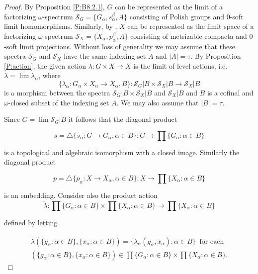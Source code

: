 \documentclass[12pt,draft]{amsart}
\theoremstyle{plain}
\theoremstyle{definition}
\numberwithin{equation}{section}
\begin{document}
\begin{proof}
By Proposition \ref{P:B8.2.1},  $G$ can be represented as
the limit of a factorizing $\omega$-spectrum
${\mathcal S}_{G} = \{ G_{\alpha}, s_{\alpha}^{\beta}, A\}$
consisting of Polish groups and $0$-soft limit homomorphisms.
Similarly, by \cite[Proposition 6.3.5]{chibook96}, $X$ can be
represented as the limit space of a factorizing $\omega$-spectrum
${\mathcal S}_{X} = \{ X_{\alpha}, p_{\alpha}^{\beta}, A\}$
consisting of metrizable compacta and $0$-soft limit projections.
Without loss of generality we may assume that these spectra
${\mathcal S}_{G}$ and ${\mathcal S}_{X}$ have the same indexing
set $A$ and $|A| = \tau$. By Proposition \ref{P:action}, the given
action $\lambda \colon G \times X \to X$ is the limit of level
actions, i.e.
$\lambda = \lim \lambda_{\alpha}$, where 
\[ \{ \lambda_{\alpha} \colon G_{\alpha} \times X_{\alpha}
\to X_{\alpha} , B\} \colon {\mathcal S}_{G}|B \times
{\mathcal S}_{X}|B \to {\mathcal S}_{X}|B\]
 \noindent is a morphism between the spectra
${\mathcal S}_{G}|B \times {\mathcal S}_{X}|B$ and
${\mathcal S}_{X}|B$ and $B$ is a cofinal and
$\omega$-closed subset of the indexing set $A$. We may also
assume that $|B| = \tau$. 

Since $G = \lim {\mathcal S}_{G}|B$ it follows that the
diagonal product

\[ s = \triangle \{ s_{\alpha} \colon G \to G_{\alpha} ,
\alpha \in B\} \colon G \to \prod\{ G_{\alpha} \colon \alpha \in B\}\]

\noindent is a topological and algebraic isomorphism with
a closed image. Similarly
the diagonal product

\[ p = \triangle \{ p_{\alpha} \colon X \to X_{\alpha} ,
\alpha \in B\} \colon X \to \prod\{ X_{\alpha} \colon \alpha \in B\}\]

\noindent is an embedding. Consider also the product action
\[ \widetilde{\lambda} \colon \prod\{ G_{\alpha} \colon \alpha \in B\}
\times \prod\{ X_{\alpha} \colon \alpha \in B\} \to
\prod\{ X_{\alpha} \colon \alpha \in B\}\]

\noindent defined by letting

\begin{multline*}
 \widetilde{\lambda}\left( \{ g_{\alpha} \colon
\alpha \in B\} ,\{ x_{\alpha} \colon \alpha \in B \}\right) =
\{ \lambda_{\alpha}(g_{\alpha}, x_{\alpha}) \colon \alpha \in B\}
\;\;\text{for each}\\
 \left( \{ g_{\alpha} \colon
\alpha \in B\} ,\{ x_{\alpha} \colon \alpha \in B \}\right)
\in \prod\{ G_{\alpha} \colon \alpha \in B\} \times
\prod\{ X_{\alpha} \colon \alpha \in B\} .
\end{multline*}


\end{proof}
\end{document}
